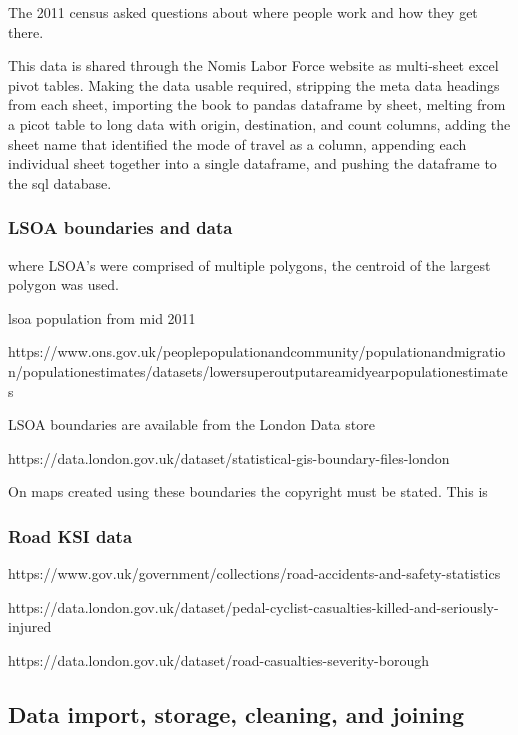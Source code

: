 \documentclass[11pt]{article} %
\begin{document}
The 2011 census asked questions about where people work and how they get there. 

This data is shared through the Nomis Labor Force website as multi-sheet excel pivot tables. Making the data usable required, stripping the meta data headings from each sheet, importing the book to pandas dataframe by sheet, melting from a picot table to long data with origin, destination, and count columns, adding the sheet name that identified the mode of travel as a column, appending each individual sheet together into a single dataframe, and pushing the dataframe to the sql database. 

\subsubsection{LSOA boundaries and data}

where LSOA's were comprised of multiple polygons, the centroid of the largest polygon was used. 

lsoa population from mid 2011 

https://www.ons.gov.uk/peoplepopulationandcommunity/populationandmigration/populationestimates/datasets/lowersuperoutputareamidyearpopulationestimates

LSOA boundaries are available from the London Data store

https://data.london.gov.uk/dataset/statistical-gis-boundary-files-london

On maps created using these boundaries the copyright must be stated. This is

\subsubsection{Road KSI data}

https://www.gov.uk/government/collections/road-accidents-and-safety-statistics

https://data.london.gov.uk/dataset/pedal-cyclist-casualties-killed-and-seriously-injured

https://data.london.gov.uk/dataset/road-casualties-severity-borough

\subsection{Data import, storage, cleaning, and joining}
\end{document}
